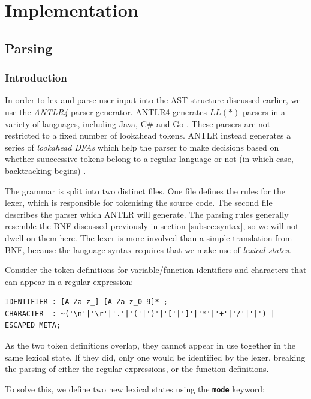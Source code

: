 \documentclass[a4paper,openany,12pt]{book}
\begin{document}
\section{Implementation}

\subsection{Parsing}

\subsubsection{Introduction}

In order to lex and parse user input into the AST structure discussed earlier, we use the \emph{ANTLR4} parser generator.
ANTLR4 generates $LL(*)$ parsers in a variety of languages, including Java, C\# and Go \citep{parr2011ll}.
These parsers are not restricted to a fixed number of lookahead tokens.
ANTLR instead generates a series of \emph{lookahead DFAs} which help the parser to make decisions based on whether
suuccessive tokens belong to a regular language or not (in which case, backtracking begins) \citep[p.~3]{parr2011ll}.

The grammar is split into two distinct files.
One file defines the rules for the lexer, which is responsible for tokenising the source code.
The second file describes the parser which ANTLR will generate.
The parsing rules generally resemble the BNF discussed previously in section \ref{subsec:syntax}, so we will not
dwell on them here.
The lexer is more involved than a simple translation from BNF, because the language syntax requires that we make use of
\emph{lexical states}.

Consider the token definitions for variable/function identifiers and characters that can appear in a regular expression:

\begin{verbatim}
IDENTIFIER : [A-Za-z_] [A-Za-z_0-9]* ;
CHARACTER  : ~('\n'|'\r'|'.'|'('|')'|'['|']'|'*'|'+'|'/'|'|') | ESCAPED_META;
\end{verbatim}

As the two token definitions overlap, they cannot appear in use together in the same lexical state.
If they did, only one would be identified by the lexer, breaking the parsing of either the regular expressions, or the
function definitions.

To solve this, we define two new lexical states using the \textbf{\texttt{mode}} keyword:
\end{document}
